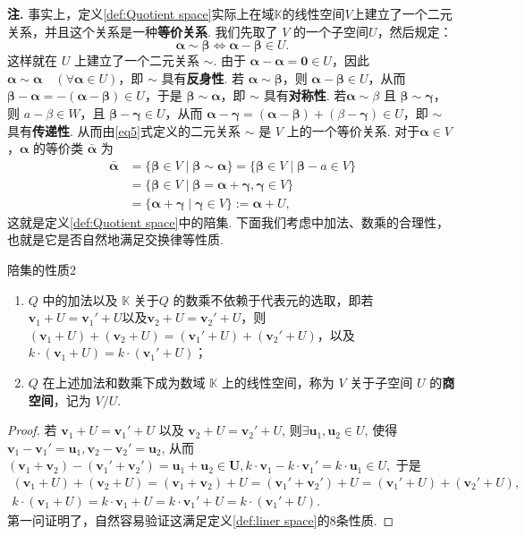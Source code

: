 \documentclass[12pt, a4paper,newtx]{ctexart}
\newenvironment{remark}{\dbend\textbf{注. }}{}{}
\begin{document}
\begin{remark}
	事实上，定义\ref{def:Quotient space}实际上在域$\mathbb K$的线性空间$V$上建立了一个二元关系，并且这个关系是一种\textbf{等价关系}. 我们先取了 $V$ 的一个子空间$U$，然后规定：
	\begin{equation}\label{eq5}
		\bm\alpha\sim\bm\beta \iff \bm\alpha - \bm\beta \in U.
	\end{equation}
	这样就在 $U$ 上建立了一个二元关系 $\sim$. 由于 $\bm\alpha -\bm\alpha = \bm 0 \in U$，因此 $\bm\alpha\sim\bm\alpha\quad (\forall \bm\alpha \in U)$，即 $\sim$ 具有\textbf{反身性}. 若 $\bm\alpha \sim \bm \beta$，则 $\bm\alpha - \bm \beta \in U$，从而 $\bm \beta - \bm\alpha = -(\bm\alpha - \bm \beta) \in U$，于是 $\bm \beta \sim \bm\alpha$，即 $\sim$ 具有\textbf{对称性}. 若$\bm\alpha\sim \beta$ 且 $\bm\beta \sim \bm\gamma$，则 $a - \beta \in W$，且 $\bm \beta - \bm \gamma \in U$，从而 $\bm\alpha- \bm\gamma = (\bm\alpha - \bm\beta) + (\beta - \bm\gamma) \in U$，即 $\sim$ 具有\textbf{传递性}. 从而由\eqref{eq5}式定义的二元关系 $\sim$ 是 $V$ 上的一个等价关系. 对于$\bm\alpha\in V$，$\bm\alpha$ 的等价类 $\bar{\bm\alpha}$ 为
	\begin{align*}
		\bar{\bm\alpha} &= \{\bm\beta \in V \mid \bm\beta \sim\bm\alpha\} = \{\bm\beta \in V \mid \bm\beta - a \in V\}
		\\&= \{\bm\beta \in V \mid \bm\beta = \bm\alpha + \bm\gamma, \bm\gamma \in V\}
		\\&= \{\bm\alpha+ \bm\gamma \mid \bm\gamma \in V\}:=\bm\alpha+U, 
	\end{align*}
	这就是定义\ref{def:Quotient space}中的陪集. 
\end{remark}
下面我们考虑中加法、数乘的合理性，也就是它是否自然地满足交换律等性质. 
\begin{proposition}{陪集的性质2}{}
	\begin{enumerate}
		\item $Q$ 中的加法以及 $\mathbb K$ 关于$Q$ 的数乘不依赖于代表元的选取，即若 $\bm v_1 + U = \bm v_1' + U $以及$\bm v_2 + U = \bm v_2' + U$，则$(\bm v_1 + U) + (\bm v_2 + U) = (\bm v_1' + U) + (\bm v_2' + U)$，以及 $k \cdot (\bm v_1 + U) = k \cdot (\bm v_1' + U)$；
		\item $Q$ 在上述加法和数乘下成为数域 $\mathbb K$ 上的线性空间，称为 $V$ 关于子空间 $U$ 的\textbf{商空间}，记为 $V/U$.
	\end{enumerate}
\end{proposition}
\begin{proof}
	若 $\bm v_1 + U = \bm v_1' + U$ 以及 $\bm v_2 + U = \bm v_2' + U$, 则$\exists \bm u_1, \bm u_2 \in U$, 使得 $\bm v_1 -\bm v_1' = \bm u_1, \bm v_2 -\bm v_2' =\bm u_2$, 从而$(\bm v_1 +\bm v_2) - (\bm v_1' +\bm v_2') = \bm u_1 +\bm u_2 \in \bm U, k \cdot \bm v_1 - k \cdot \bm v_1' = k \cdot \bm u_1 \in U,$ 于是
	\begin{gather*}
		(\bm v_1 + U) + (\bm v_2 + U) = (\bm v_1 + \bm v_2) + U = (\bm v_1' + \bm v_2') + U = (\bm v_1' + U) + (\bm v_2' + U),\\k \cdot (\bm v_1 + U) = k \cdot \bm v_1 + U = k \cdot \bm v_1' + U = k \cdot (\bm v_1' + U).
	\end{gather*}
	第一问证明了，自然容易验证这满足定义\ref{def:liner space}的$8$条性质. 
\end{proof}
\end{document}
